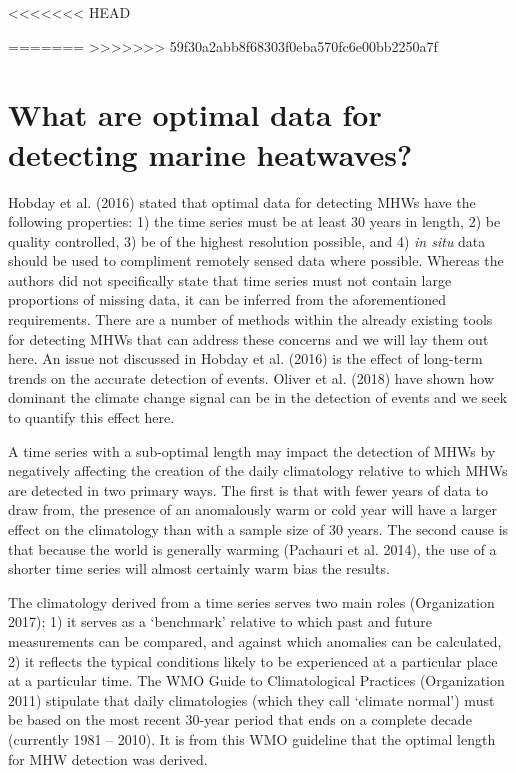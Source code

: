 \documentclass[]{article}
\begin{document}
<<<<<<< HEAD
\hypertarget{what-are-optimal-data-for-detecting-marine-heatwaves}{%
=======
>>>>>>> 59f30a2abb8f68303f0eba570fc6e00bb2250a7f
\section{What are optimal data for detecting marine
heatwaves?}\label{what-are-optimal-data-for-detecting-marine-heatwaves}

Hobday et al. (2016) stated that optimal data for detecting MHWs have
the following properties: 1) the time series must be at least 30 years
in length, 2) be quality controlled, 3) be of the highest resolution
possible, and 4) \emph{in situ} data should be used to compliment
remotely sensed data where possible. Whereas the authors did not
specifically state that time series must not contain large proportions
of missing data, it can be inferred from the aforementioned
requirements. There are a number of methods within the already existing
tools for detecting MHWs that can address these concerns and we will lay
them out here. An issue not discussed in Hobday et al. (2016) is the
effect of long-term trends on the accurate detection of events. Oliver
et al. (2018) have shown how dominant the climate change signal can be
in the detection of events and we seek to quantify this effect here.

A time series with a sub-optimal length may impact the detection of MHWs
by negatively affecting the creation of the daily climatology relative
to which MHWs are detected in two primary ways. The first is that with
fewer years of data to draw from, the presence of an anomalously warm or
cold year will have a larger effect on the climatology than with a
sample size of 30 years. The second cause is that because the world is
generally warming (Pachauri et al. 2014), the use of a shorter time
series will almost certainly warm bias the results.

The climatology derived from a time series serves two main roles
(Organization 2017); 1) it serves as a `benchmark' relative to which
past and future measurements can be compared, and against which
anomalies can be calculated, 2) it reflects the typical conditions
likely to be experienced at a particular place at a particular time. The
WMO Guide to Climatological Practices (Organization 2011) stipulate that
daily climatologies (which they call `climate normal') must be based on
the most recent 30-year period that ends on a complete decade (currently
1981 -- 2010). It is from this WMO guideline that the optimal length for
MHW detection was derived.

}
\end{document}
